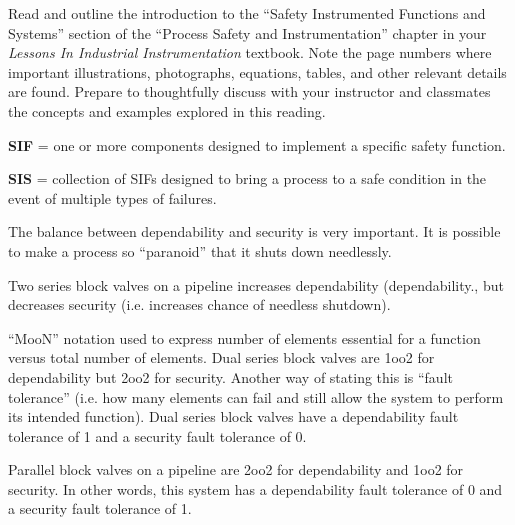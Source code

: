 

Read and outline the introduction to the ``Safety Instrumented Functions and Systems'' section of the ``Process Safety and Instrumentation'' chapter in your {\it Lessons In Industrial Instrumentation} textbook.  Note the page numbers where important illustrations, photographs, equations, tables, and other relevant details are found.  Prepare to thoughtfully discuss with your instructor and classmates the concepts and examples explored in this reading.














\noindent
{\bf SIF} = one or more components designed to implement a specific safety function.

\vskip 10pt

\noindent
{\bf SIS} = collection of SIFs designed to bring a process to a safe condition in the event of multiple types of failures.

\vskip 10pt

The balance between dependability and security is very important.  It is possible to make a process so ``paranoid'' that it shuts down needlessly.  

\vskip 10pt

Two series block valves on a pipeline increases dependability (dependability., but decreases security (i.e. increases chance of needless shutdown).

\vskip 10pt

``MooN'' notation used to express number of elements essential for a function versus total number of elements.  Dual series block valves are 1oo2 for dependability but 2oo2 for security.  Another way of stating this is ``fault tolerance'' (i.e. how many elements can fail and still allow the system to perform its intended function).  Dual series block valves have a dependability fault tolerance of 1 and a security fault tolerance of 0.

Parallel block valves on a pipeline are 2oo2 for dependability and 1oo2 for security.  In other words, this system has a dependability fault tolerance of 0 and a security fault tolerance of 1.

